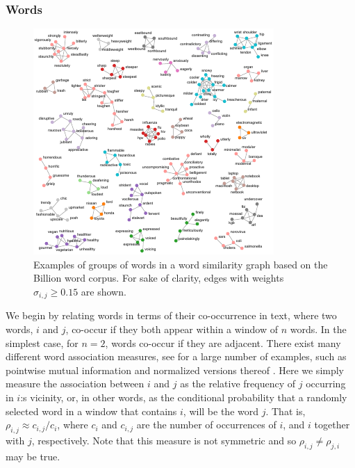 \documentclass{kais}
\newcommand{\rn}[1]{\rho_{#1}}
\newcommand{\sy}[1]{\sigma_{#1}}
\begin{document}
\subsubsection{Words}
\label{sec:words}

\begin{figure}
\centerline{\includegraphics[width=1.0\columnwidth]{figures/billion-words-example.pdf}}
\caption{Examples of groups of words in a word similarity graph based on the Billion word corpus. 
For sake of clarity, edges with weights $\sy{i,j} \geq 0.15$ are shown.}
\label{fig:billion-words-example}
\end{figure}

We begin by relating words in terms of their co-occurrence in text, where two words, $i$ and $j$, co-occur if they both
appear within a window of $n$ words. In the simplest case, for $n = 2$, words co-occur if they are adjacent.
There exist many different word association measures, see \cite{Pecina08} for a large number of examples, such as
pointwise mutual information \cite{Church90} and normalized versions thereof \cite{Bouma09}. Here we simply measure the
association between $i$ and $j$ as the relative frequency of $j$ occurring in $i$:s vicinity, or, in other words, as the
conditional probability that a randomly selected word in a window that contains $i$, will be the word $j$. That is, $\rn{i,j}
\approx c_{i,j}/{c_i}$, where $c_i$ and $c_{i,j}$ are the number of occurrences of $i$, and $i$ together with $j$,
respectively. Note that this measure is not symmetric and so $\rn{i,j} \neq \rn{j,i}$ may be true.
\end{document}
